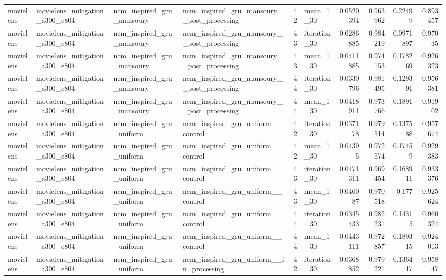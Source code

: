 \begin{table}[htbp!]
\begin{tabular}{llllrlrrrr}
movielens & movielens\_mitigation\_a300\_e804 & ncm\_inspired\_gru\_mansoury & ncm\_inspired\_gru\_mansoury\_\_post\_processing & 42 & mean\_1\_30 & 0.0520394 & 0.963962 & 0.22499 & 0.893457 \\
movielens & movielens\_mitigation\_a300\_e804 & ncm\_inspired\_gru\_mansoury & ncm\_inspired\_gru\_mansoury\_\_post\_processing & 43 & iteration\_30 & 0.0286885 & 0.984219 & 0.0971897 & 0.97035 \\
movielens & movielens\_mitigation\_a300\_e804 & ncm\_inspired\_gru\_mansoury & ncm\_inspired\_gru\_mansoury\_\_post\_processing & 43 & mean\_1\_30 & 0.0411885 & 0.974153 & 0.178269 & 0.926323 \\
movielens & movielens\_mitigation\_a300\_e804 & ncm\_inspired\_gru\_mansoury & ncm\_inspired\_gru\_mansoury\_\_post\_processing & 44 & iteration\_30 & 0.0330796 & 0.981495 & 0.129391 & 0.956381 \\
movielens & movielens\_mitigation\_a300\_e804 & ncm\_inspired\_gru\_mansoury & ncm\_inspired\_gru\_mansoury\_\_post\_processing & 44 & mean\_1\_30 & 0.0418911 & 0.973766 & 0.1891 & 0.91902 \\
movielens & movielens\_mitigation\_a300\_e804 & ncm\_inspired\_gru\_uniform & ncm\_inspired\_gru\_uniform\_\_control & 42 & iteration\_30 & 0.037178 & 0.979514 & 0.137588 & 0.957674 \\
movielens & movielens\_mitigation\_a300\_e804 & ncm\_inspired\_gru\_uniform & ncm\_inspired\_gru\_uniform\_\_control & 42 & mean\_1\_30 & 0.04395 & 0.972574 & 0.17459 & 0.929383 \\
movielens & movielens\_mitigation\_a300\_e804 & ncm\_inspired\_gru\_uniform & ncm\_inspired\_gru\_uniform\_\_control & 43 & iteration\_30 & 0.0471311 & 0.969454 & 0.168911 & 0.933376 \\
movielens & movielens\_mitigation\_a300\_e804 & ncm\_inspired\_gru\_uniform & ncm\_inspired\_gru\_uniform\_\_control & 43 & mean\_1\_30 & 0.046087 & 0.970518 & 0.177 & 0.925624 \\
movielens & movielens\_mitigation\_a300\_e804 & ncm\_inspired\_gru\_uniform & ncm\_inspired\_gru\_uniform\_\_control & 44 & iteration\_30 & 0.0345433 & 0.982231 & 0.14315 & 0.960324 \\
movielens & movielens\_mitigation\_a300\_e804 & ncm\_inspired\_gru\_uniform & ncm\_inspired\_gru\_uniform\_\_control & 44 & mean\_1\_30 & 0.0443111 & 0.972857 & 0.189315 & 0.924013 \\
movielens & movielens\_mitigation\_a300\_e804 & ncm\_inspired\_gru\_uniform & ncm\_inspired\_gru\_uniform\_\_in\_processing & 42 & iteration\_30 & 0.0368852 & 0.979221 & 0.136417 & 0.95847 \\

\end{tabular}
\end{table}
